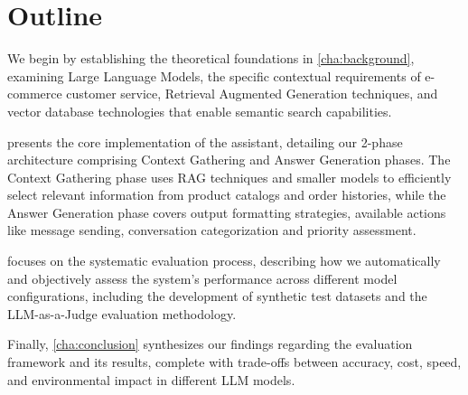 \section{Outline}


We begin by establishing the theoretical foundations in \cref{cha:background}, examining Large Language Models, the specific contextual requirements of e-commerce customer service, Retrieval Augmented Generation techniques, and vector database technologies that enable semantic search capabilities.

 presents the core implementation of the assistant, detailing our 2-phase architecture comprising Context Gathering and Answer Generation phases. The Context Gathering phase uses RAG techniques and smaller models to efficiently select relevant information from product catalogs and order histories, while the Answer Generation phase covers output formatting strategies, available actions like message sending, conversation categorization and priority assessment.

 focuses on the systematic evaluation process, describing how we automatically and objectively assess the system's performance across different model configurations, including the development of synthetic test datasets and the LLM-as-a-Judge evaluation methodology.

Finally, \cref{cha:conclusion} synthesizes our findings regarding the evaluation framework and its results, complete with trade-offs between accuracy, cost, speed, and environmental impact in different LLM models.

